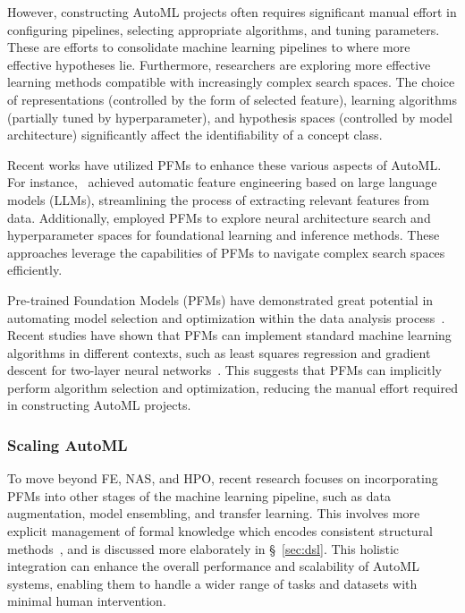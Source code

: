   However, constructing AutoML projects often requires significant manual effort in configuring pipelines, selecting appropriate algorithms, and tuning parameters. These are efforts to consolidate machine learning pipelines to where more effective hypotheses lie. Furthermore, researchers are exploring more effective learning methods compatible with increasingly complex search spaces. The choice of representations (controlled by the form of selected feature), learning algorithms (partially tuned by hyperparameter), and hypothesis spaces (controlled by model architecture) significantly affect the identifiability of a concept class.
  
  Recent works have utilized PFMs to enhance these various aspects of AutoML. For instance,~\cite{Hollmann2023LargeLM,malberg2024felix,LinDJZ24} achieved automatic feature engineering based on large language models (LLMs), streamlining the process of extracting relevant features from data. Additionally,\cite{sayed2024gizaml} employed PFMs to explore neural architecture search and hyperparameter spaces for foundational learning and inference methods. These approaches leverage the capabilities of PFMs to navigate complex search spaces efficiently.
  
  Pre-trained Foundation Models (PFMs) have demonstrated great potential in automating model selection and optimization within the data analysis process~\cite{liu2023jarvix}. Recent studies have shown that PFMs can implement standard machine learning algorithms in different contexts, such as least squares regression and gradient descent for two-layer neural networks~\cite{bai2024transformers}. This suggests that PFMs can implicitly perform algorithm selection and optimization, reducing the manual effort required in constructing AutoML projects.
  
  
  
  \subsubsection{Scaling AutoML}\label{sec:scaling_automl}
  
  To move beyond FE, NAS, and HPO, recent research focuses on incorporating PFMs into other stages of the machine learning pipeline, such as data augmentation, model ensembling, and transfer learning. This involves more explicit management of formal knowledge which encodes consistent structural methods~\cite{SongY00024, HsuMTW23}, and is discussed more elaborately in \S~\ref{sec:dsl}. This holistic integration can enhance the overall performance and scalability of AutoML systems, enabling them to handle a wider range of tasks and datasets with minimal human intervention.
  
